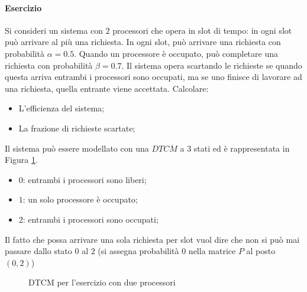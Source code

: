 \documentclass{article}
\begin{document}
\paragraph{Esercizio} Si consideri un sistema con $2$ processori che opera in slot di tempo:
in ogni slot può arrivare al più una richiesta. In ogni slot, può arrivare una richiesta con 
probabilità $\alpha = 0.5$. Quando un processore è occupato, può completare una richiesta con
probabilità $\beta = 0.7$. Il sistema opera scartando le richieste se quando questa arriva
entrambi i processori sono occupati, ma se uno finisce di lavorare ad una richiesta, quella
entrante viene accettata.
Calcolare:
\begin{itemize}
  \item L'efficienza del sistema;
  \item La frazione di richieste scartate;
\end{itemize}

Il sistema può essere modellato con una $DTCM$ a $3$ stati ed è rappresentata in Figura 
\ref{fig:dtcm-3state-ex}.

\begin{itemize}
  \item $0$: entrambi i processori sono liberi;
  \item $1$: un solo processore è occupato;
  \item $2$: entrambi i processori sono occupati;
\end{itemize}

Il fatto che possa arrivare una sola richiesta per slot vuol dire che non si può mai passare
dallo stato $0$ al $2$ (si assegna probabilità $0$ nella matrice $P$ al posto $(0,2)$)

\begin{figure}
  \centering
  \caption{DTCM per l'esercizio con due processori}
  \label{fig:dtcm-3state-ex}
\end{figure}
\end{document}
